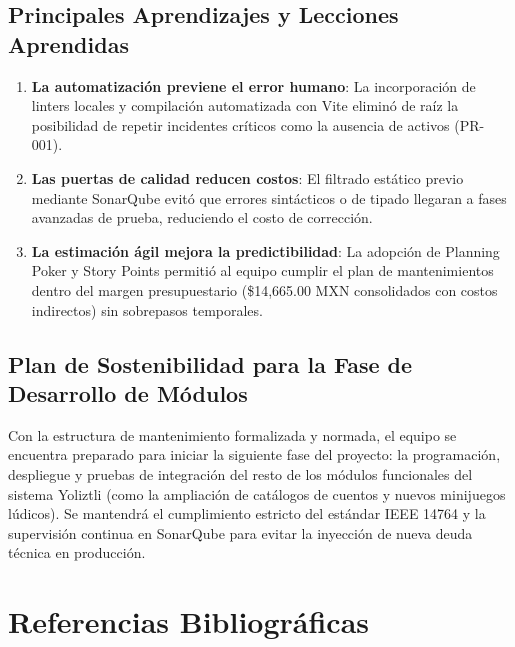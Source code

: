 \documentclass[12pt]{article}
\begin{document}
\subsection{Principales Aprendizajes y Lecciones Aprendidas}
\begin{enumerate}
    \item \textbf{La automatización previene el error humano}: La incorporación de linters locales y compilación automatizada con Vite eliminó de raíz la posibilidad de repetir incidentes críticos como la ausencia de activos (PR-001).
    \item \textbf{Las puertas de calidad reducen costos}: El filtrado estático previo mediante SonarQube evitó que errores sintácticos o de tipado llegaran a fases avanzadas de prueba, reduciendo el costo de corrección.
    \item \textbf{La estimación ágil mejora la predictibilidad}: La adopción de Planning Poker y Story Points permitió al equipo cumplir el plan de mantenimientos dentro del margen presupuestario (\$14,665.00 MXN consolidados con costos indirectos) sin sobrepasos temporales.
\end{enumerate}

\subsection{Plan de Sostenibilidad para la Fase de Desarrollo de Módulos}
Con la estructura de mantenimiento formalizada y normada, el equipo se encuentra preparado para iniciar la siguiente fase del proyecto: la programación, despliegue y pruebas de integración del resto de los módulos funcionales del sistema Yoliztli (como la ampliación de catálogos de cuentos y nuevos minijuegos lúdicos). Se mantendrá el cumplimiento estricto del estándar IEEE 14764 y la supervisión continua en SonarQube para evitar la inyección de nueva deuda técnica en producción.

\newpage
\section*{Referencias Bibliográficas}
\end{document}
